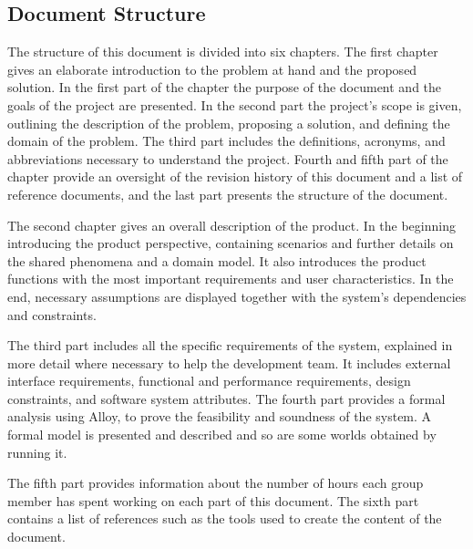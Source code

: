 \newpage
\subsection{Document Structure}
\hspace{\parindent}The structure of this document is divided into six chapters. 
The first chapter gives an elaborate introduction to the problem at hand and the proposed solution. In the first part of the chapter the purpose of the document and the goals of the project are presented. In the second part the project's scope is given, outlining the description of the problem, proposing a solution, and defining the domain of the problem. The third part includes the definitions, acronyms, and abbreviations necessary to understand the project. Fourth and fifth part of the chapter provide an oversight of the revision history of this document and a list of reference documents, and the last part presents the structure of the document.
 
The second chapter gives an overall description of the product. In the beginning introducing the product perspective, containing scenarios and further details on the shared phenomena and a domain model. It also introduces the product functions with the most important requirements and user characteristics. In the end, necessary assumptions are displayed together with the system's dependencies and constraints.

The third part includes all the specific requirements of the system, explained in more detail where necessary to help the development team. It includes external interface requirements, functional and performance requirements, design constraints, and software system attributes. 
The fourth part provides a formal analysis using Alloy, to prove the feasibility and soundness of the system. A formal model is presented and described and so are some worlds obtained by running it. 

The fifth part provides information about the number of hours each group member has spent working on each part of this document. 
The sixth part contains a list of references such as the tools used to create the content of the document. 
